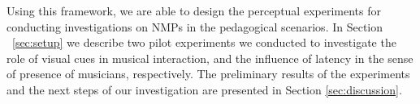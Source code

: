 \documentclass[conference]{IEEEtran}
\begin{document}
Using this framework, we are able to design the perceptual experiments for conducting investigations on NMPs in the pedagogical scenarios. In Section ~\ref{sec:setup} we describe two pilot experiments we conducted to investigate the role of visual cues in musical interaction, and the influence of latency in the sense of presence of musicians, respectively. The preliminary results of the experiments and the next steps of our investigation are presented in  Section \ref{sec:discussion}.  







\end{document}

